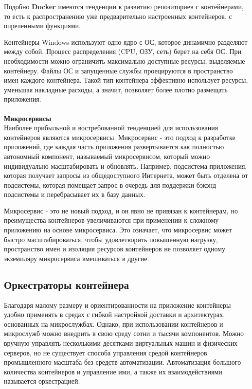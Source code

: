 Подобно \textbf{Docker} имеются тенденции к развитию репозиториев с контейнерами, то есть к распространению уже предварительно настроенных контейнеров, с опреленными функциями.

Контейнеры Windows используют одно ядро с ОС, которое динамично разделяют между собой. Процесс распределения (CPU, ОЗУ, сеть) берет на себя ОС. При необходимости можно ограничить максимально доступные ресурсы, выделяемые контейнеру. Файлы ОС и запущенные службы проецируются в пространство имен каждого контейнера. Такой тип контейнера эффективно использует ресурсы, уменьшая накладные расходы, а значит, позволяет более плотно размещать приложения.\\\\
\textbf{Микросервисы}\\
Наиболее прибыльной и востребованной тенденцией для использования контейнеров являются микросервисы. Микросервис - это подход к разработке приложений, где каждая часть приложения развертывается как полностью автономный компонент, называемый микросервисом, который можно индивидуально масштабировать и обновлять. Например, подсистема приложения, которая получает запросы из общедоступного Интернета, может быть отделена от подсистемы, которая помещает запрос в очередь для поддержки бэкэнд-подсистемы и перебрасывает их в базу данных.

Микросервис - это не новый подход, и он явно не привязан к контейнерам, но преимущества контейнеров увеличиваются при применении к сложному приложению на основе микросервиса. Это означает, что микросервис может быстро масштабироваться, чтобы удовлетворить повышенную нагрузку, пространство имен и изоляция ресурсов контейнеров не позволяет одному экземпляру микросервиса вмешиваться в другие.

\subsection{Оркестраторы контейнера}
Благодаря малому размеру и ориентированности на приложение контейнеры удобно применять в средах с гибкой настройкой доставки и архитектурах, основанных на микрослужбах. Однако, при использовании контейнеров и микрослужб можно внедрить в свою среду сотни и тысячи компонентов. Можно вручную управлять несколькими десятками виртуальных машин и физических серверов, но не существует способа управления средой контейнеров промышленного масштаба без средств автоматизации. Автоматизация большого количества контейнеров и управление ими, а также их взаимодействиями называется оркестрацией.

